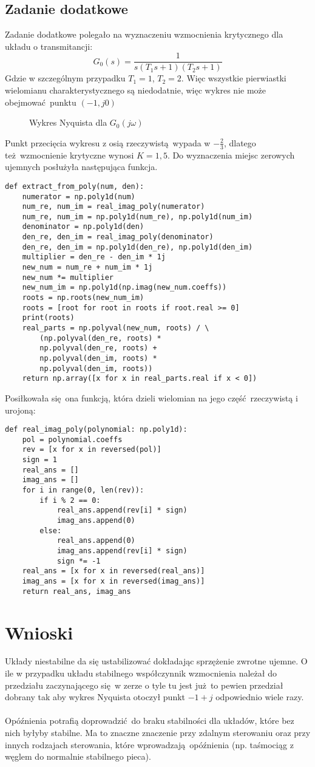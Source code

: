 \documentclass[a4paper, 12pt]{article}
\begin{document}
		\subsection{Zadanie dodatkowe}
		Zadanie dodatkowe polegało na wyznaczeniu wzmocnienia krytycznego dla układu o transmitancji:
		$$
			G_0(s) = \frac{1}{s(T_1s+1)(T_2s+1)}
		$$
		Gdzie w szczególnym przypadku $T_1 = 1$, $T_2 = 2$. Więc wszystkie pierwiastki wielomianu charakterystycznego są niedodatnie, więc wykres nie może obejmować punktu $(-1, j0)$
		\begin{figure}[H]
			\centering
			\def \svgwidth{0.7\columnwidth}
			
			\caption{Wykres Nyquista dla $G_0(j\omega)$}
		\end{figure}\noindent
		Punkt przecięcia wykresu z osią rzeczywistą wypada w $-\frac{2}{3}$, dlatego też wzmocnienie krytyczne wynosi $K = 1,5$.
		\newpage
		Do wyznaczenia miejsc zerowych ujemnych posłużyła następująca funkcja.
\begin{lstlisting}
def extract_from_poly(num, den):
	numerator = np.poly1d(num)
	num_re, num_im = real_imag_poly(numerator)
	num_re, num_im = np.poly1d(num_re), np.poly1d(num_im)
	denominator = np.poly1d(den)
	den_re, den_im = real_imag_poly(denominator)
	den_re, den_im = np.poly1d(den_re), np.poly1d(den_im)
	multiplier = den_re - den_im * 1j
	new_num = num_re + num_im * 1j
	new_num *= multiplier
	new_num_im = np.poly1d(np.imag(new_num.coeffs))
	roots = np.roots(new_num_im)
	roots = [root for root in roots if root.real >= 0]
	print(roots)
	real_parts = np.polyval(new_num, roots) / \
	    (np.polyval(den_re, roots) *
	    np.polyval(den_re, roots) +
	    np.polyval(den_im, roots) *
	    np.polyval(den_im, roots))
	return np.array([x for x in real_parts.real if x < 0])
\end{lstlisting}
		Posiłkowała się ona funkcją, która dzieli wielomian na jego część rzeczywistą i urojoną:
\begin{lstlisting}
def real_imag_poly(polynomial: np.poly1d):
	pol = polynomial.coeffs
	rev = [x for x in reversed(pol)]
	sign = 1
	real_ans = []
	imag_ans = []
	for i in range(0, len(rev)):
		if i % 2 == 0:
			real_ans.append(rev[i] * sign)
			imag_ans.append(0)
		else:
			real_ans.append(0)
			imag_ans.append(rev[i] * sign)
			sign *= -1
	real_ans = [x for x in reversed(real_ans)]
	imag_ans = [x for x in reversed(imag_ans)]
	return real_ans, imag_ans
\end{lstlisting}
	\section{Wnioski}
		Układy niestabilne da się ustabilizować dokładając sprzężenie zwrotne ujemne. O ile w przypadku układu stabilnego współczynnik wzmocnienia należał do przedziału zaczynającego się w zerze o tyle tu jest już to pewien przedział dobrany tak aby wykres Nyquista otoczył punkt $-1 + j$ odpowiednio wiele razy.
		\\ \\
		Opóźnienia potrafią doprowadzić do braku stabilności dla układów, które bez nich byłyby stabilne. Ma to znaczne znaczenie przy zdalnym sterowaniu oraz przy innych rodzajach sterowania, które wprowadzają opóźnienia (np. taśmociąg z węglem do normalnie stabilnego pieca).
\end{document}
